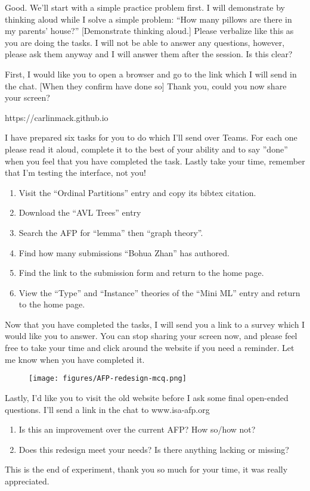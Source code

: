 \documentclass[bsc,frontabs,oneside,singlespacing,parskip,deptreport,logo]{infthesis}
\begin{document}
Good. We’ll start with a simple practice problem first. I will demonstrate by thinking aloud while I solve a simple problem: “How many pillows are there in my parents' house?” [Demonstrate thinking aloud.] Please verbalize like this as you are doing the tasks. I will not be able to answer any questions, however, please ask them anyway and I will answer them after the session. Is this clear? 

First, I would like you to open a browser and go to the link which I will send in the chat. [When they confirm have done so] Thank you, could you now share your screen? 

https://carlinmack.github.io 

I have prepared six tasks for you to do which I’ll send over Teams. For each one please read it aloud, complete it to the best of your ability and to say ''done'' when you feel that you have completed the task. Lastly take your time, remember that I’m testing the interface, not you! 

\begin{enumerate}
    \item Visit the “Ordinal Partitions” entry and copy its bibtex citation. 
    \item Download the “AVL Trees” entry 
    \item Search the AFP for “lemma” then “graph theory”. 
    \item Find how many submissions “Bohua Zhan” has authored. 
    \item Find the link to the submission form and return to the home page. 
    \item View the “Type” and “Instance” theories of the “Mini ML” entry and return to the home page. 
\end{enumerate}

Now that you have completed the tasks, I will send you a link to a survey which I would like you to answer. You can stop sharing your screen now, and please feel free to take your time and click around the website if you need a reminder. Let me know when you have completed it.   

\begin{figure}[h]
    \centering
    \texttt{[image: figures/AFP-redesign-mcq.png]}
\end{figure}

Lastly, I’d like you to visit the old website before I ask some final open-ended questions. I’ll send a link in the chat to www.isa-afp.org  

\begin{enumerate}
    \item Is this an improvement over the current AFP? How so/how not?
    \item Does this redesign meet your needs? Is there anything lacking or missing? 
\end{enumerate}

This is the end of experiment, thank you so much for your time, it was really appreciated.
\end{document}
